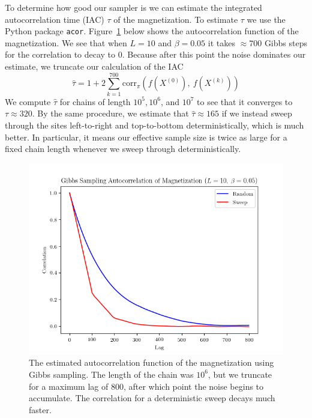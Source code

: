 \documentclass[11pt,a4paper]{amsart}
\begin{document}
\par To determine how good our sampler is we can estimate the integrated autocorrelation time (IAC) $\tau$ of the magnetization. To estimate $\tau$ we use the Python package {\tt acor}.  Figure~\ref{fig:gibbsRandomACFb005} below shows the autocorrelation function of the magnetization.  We see that when $L = 10$ and $\beta = 0.05$ it takes $\approx 700$ Gibbs steps for the correlation to decay to 0.  Because after this point the noise dominates our estimate, we truncate our calculation of the IAC
\[
\hat{\tau} = 1+ 2\sum_{k=1}^{700}\text{corr}_{\pi}(f(X^{(0)}),\  f(X^{(k)}))
\]
We compute $\hat{\tau}$ for chains of length $10^{5},10^6$, and $10^7$ to see that it converges to $\tau \approx 320$.  By the same procedure, we estimate that $\hat{\tau} \approx 165$ if we instead sweep through the sites left-to-right and top-to-bottom deterministically, which is much better.  In particular, it means our effective sample size is twice as large for a fixed chain length whenever we sweep through deterministically.

\begin{figure}[H]
\centering
\includegraphics[width=5in]{gibbsRandomACFb005.png}
\caption{The estimated autocorrelation function of the magnetization using Gibbs sampling.  The length of the chain was $10^6$, but we truncate for a maximum lag of 800, after which point the noise begins to accumulate.  The correlation for a deterministic sweep decays much faster.}
\label{fig:gibbsRandomACFb005}
\end{figure}
\end{document}
